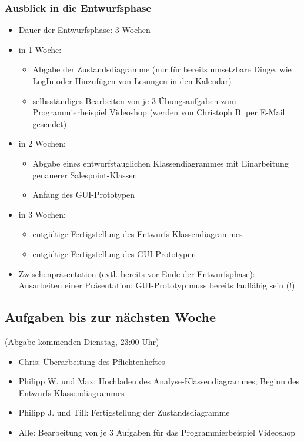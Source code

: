 \documentclass[12pt,a4paper]{article}
\begin{document}
\subsubsection*{Ausblick in die Entwurfsphase}
\begin{itemize}
\item Dauer der Entwurfsphase: 3 Wochen
\item in 1 Woche:
\begin{itemize}
\item Abgabe der Zustandsdiagramme (nur für bereits umsetzbare Dinge, wie LogIn oder Hinzufügen von Lesungen in den Kalendar)
\item selbsständiges Bearbeiten von je 3 Übungsaufgaben zum Programmierbeispiel Videoshop (werden von Christoph B. per E-Mail gesendet)
\end{itemize}
\item in 2 Wochen: 
\begin{itemize}
\item Abgabe eines entwurfstauglichen Klassendiagrammes mit Einarbeitung genauerer Salespoint-Klassen
\item Anfang des GUI-Prototypen
\end{itemize}
\item in 3 Wochen:
\begin{itemize}
\item entgültige Fertigstellung des Entwurfs-Klassendiagrammes
\item entgültige Fertigstellung des GUI-Prototypen
\end{itemize}
\item Zwischenpräsentation (evtl. bereits vor Ende der Entwurfsphase): Ausarbeiten einer Präsentation; GUI-Prototyp muss bereits lauffähig sein (!)
\end{itemize}

\subsection*{Aufgaben bis zur nächsten Woche}
(Abgabe kommenden Dienstag, 23:00 Uhr)
\medskip
\begin{itemize}
\item Chris: Überarbeitung des Pflichtenheftes
\item Philipp W. und Max: Hochladen des Analyse-Klassendiagrammes; Beginn des Entwurfs-Klassendiagrammes
\item Philipp J. und Till: Fertigstellung der Zustandsdiagramme
\item Alle: Bearbeitung von je 3 Aufgaben für das Programmierbeispiel Videoshop
\end{itemize}
\end{document}
